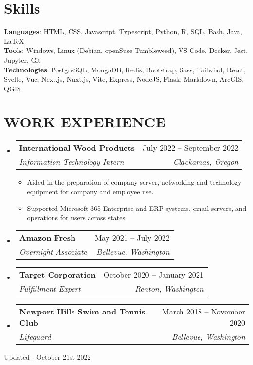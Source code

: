 \documentclass[letterpaper,11pt]{article}
\makeatletter
\newcommand{\resumeItem}[1]{
  \item\small{
    {#1 \vspace{-2pt}}
  }
}
\newcommand{\resumeSubheading}[4]{
  \vspace{-2pt}\item
    \begin{tabular*}{0.97\textwidth}[t]{l@{\extracolsep{\fill}}r}
      \textbf{#1} & #2 \\
      \textit{\small#3} & \textit{\small #4} \\
    \end{tabular*}\vspace{-7pt}
}
\newcommand{\resumeSubHeadingListStart}{\begin{itemize}[leftmargin=0.15in, label={}]}
\newcommand{\resumeSubHeadingListEnd}{\end{itemize}}
\newcommand{\resumeItemListStart}{\begin{itemize}}
\newcommand{\resumeItemListEnd}{\end{itemize}\vspace{-5pt}}
\makeatother
\begin{document}
\section{Skills}
 \begin{itemize}[leftmargin=0.15in, label={}]
    \small{\item{
     \textbf{Languages}{: HTML, CSS, Javascript, Typescript, Python, R, SQL, Bash, Java, LaTeX} \\
     \textbf{Tools}{: Windows, Linux (Debian, openSuse Tumbleweed), VS Code, Docker, Jest, Jupyter, Git} \\
     \textbf{Technologies}{: PostgreSQL, MongoDB, Redis, Bootstrap, Sass, Tailwind, React, Svelte, Vue, Next.js, Nuxt.js, Vite, Express, NodeJS, Flask, Markdown, ArcGIS, QGIS} \\
    }}
 \end{itemize}
 \vspace{-16pt}

\section{WORK EXPERIENCE}
  \resumeSubHeadingListStart

    \resumeSubheading
      {International Wood Products}{July 2022 -- September 2022}
      {Information Technology Intern}{Clackamas, Oregon}
      \resumeItemListStart
        \resumeItem{Aided in the preparation of company server, networking and technology equipment for company and employee use.}
        \resumeItem{Supported Microsoft 365 Enterprise and ERP systems, email servers, and operations for users across states.}
      \resumeItemListEnd

    \resumeSubheading
      {Amazon Fresh}{May 2021 -- July 2022}
      {Overnight Associate}{Bellevue, Washington}

    \resumeSubheading
      {Target Corporation}{October 2020 -- January 2021}
      {Fulfillment Expert}{Renton, Washington}

    \resumeSubheading
      {Newport Hills Swim and Tennis Club}{March 2018 -- November 2020}
      {Lifeguard}{Bellevue, Washington}

  \resumeSubHeadingListEnd
\vspace{-16pt}

\begin{center}
    \tiny Updated - October 21st 2022
\end{center}
\end{document}
